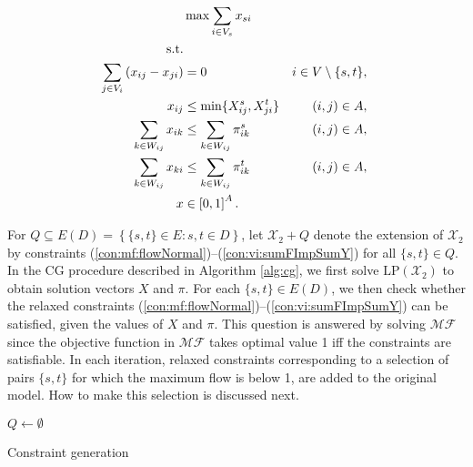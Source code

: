 \begin{subequations}\label{eq:mf}
\begin{align}
\label{objective:maxf} &\max\sum\limits_{i \in V_s} x_{si} \\ 
\text{s.t.}  \notag   \\
\label{con:maxf:flowNormal}  \sum\limits_{\substack{ j\in V_i}}\left(x_{ij}-x_{ji}\right) & = 0 & i\in V\setminus\{s,t\},\\
\label{con:maxf:fcapst}   x_{ij} &\leq \min\{X_{ij}^s, X_{ji}^t\}     &  (i,j)\in A,  \\ 	 
\label{con:maxf:sumFImpSumYst} \sum_{k\in W_{ij}}x_{ik} & \leq \sum_{k\in W_{ij}} \pi^{s}_{ik} & (i,j)\in A,\\
\label{con:maxf:sumFImpSumYts} \sum_{k\in W_{ij}}x_{ki} & \leq \sum_{k\in W_{ij}} \pi^{t}_{ik} & (i,j)\in A,\\
\label{con:maxf:fdim}x&\in\left[0,1\right]^{A}. 
\end{align}~
\end{subequations}  
  
For $Q\subseteq E(D)=\left\{\{s,t\}\in E: s,t\in D\right\}$, let $\mathcal{X}_2+Q$ denote the extension of $\mathcal{X}_2$ by constraints (\ref{con:mf:flowNormal})--(\ref{con:vi:sumFImpSumY}) for all $\{s,t\}\in Q$.
In the CG procedure described in Algorithm \ref{alg:cg},
we first solve $\text{LP}(\mathcal{X}_2)$ to obtain solution vectors $X$ and $\pi$.
For each $\{s,t\}\in E(D)$, we then check whether the relaxed constraints (\ref{con:mf:flowNormal})--(\ref{con:vi:sumFImpSumY}) can be satisfied,
given the values of $X$ and $\pi$.
This question is answered by solving $\mathcal{MF}$
since the objective function in $\mathcal{MF}$ takes optimal value 1 iff the constraints are satisfiable.
In each iteration,
relaxed constraints corresponding to a selection of pairs $\{s,t\}$ for which the maximum flow is below 1, are added to the original model.
How to make this selection is discussed next.

\begin{algorithm}
$Q\leftarrow\emptyset$\\
 \caption{Constraint generation}
\label{alg:cg}
\end{algorithm}


